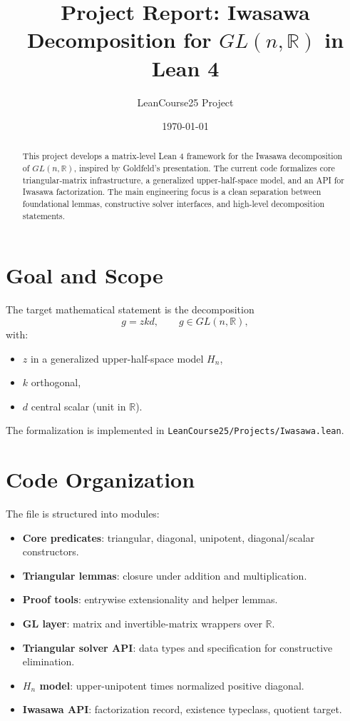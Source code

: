 \documentclass[11pt]{article}
\title{Project Report: Iwasawa Decomposition for \texorpdfstring{$GL(n,\mathbb{R})$}{GL(n,R)} in Lean 4}
\author{LeanCourse25 Project}
\date{\today}
\begin{document}
\maketitle

\begin{abstract}
This project develops a matrix-level Lean 4 framework for the Iwasawa decomposition of
$GL(n,\mathbb{R})$, inspired by Goldfeld's presentation.
The current code formalizes core triangular-matrix infrastructure, a generalized upper-half-space model,
and an API for Iwasawa factorization. The main engineering focus is a clean separation between
foundational lemmas, constructive solver interfaces, and high-level decomposition statements.
\end{abstract}

\section{Goal and Scope}
The target mathematical statement is the decomposition
\[
g = zkd, \qquad g \in GL(n,\mathbb{R}),
\]
with:
\begin{itemize}[leftmargin=1.5em]
\item $z$ in a generalized upper-half-space model $H_n$,
\item $k$ orthogonal,
\item $d$ central scalar (unit in $\mathbb{R}$).
\end{itemize}
The formalization is implemented in
\texttt{LeanCourse25/Projects/Iwasawa.lean}.

\section{Code Organization}
The file is structured into modules:
\begin{itemize}[leftmargin=1.5em]
\item \textbf{Core predicates}: triangular, diagonal, unipotent, diagonal/scalar constructors.
\item \textbf{Triangular lemmas}: closure under addition and multiplication.
\item \textbf{Proof tools}: entrywise extensionality and helper lemmas.
\item \textbf{GL layer}: matrix and invertible-matrix wrappers over $\mathbb{R}$.
\item \textbf{Triangular solver API}: data types and specification for constructive elimination.
\item \textbf{$H_n$ model}: upper-unipotent times normalized positive diagonal.
\item \textbf{Iwasawa API}: factorization record, existence typeclass, quotient target.
\end{itemize}
\end{document}

